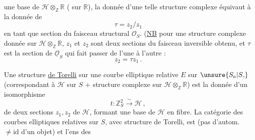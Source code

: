
une base de $\mathscr{H}\otimes_{\mathbb{Z}}\mathbb{R}$ ( sur $\mathbb{R}$), la donnée d'une telle structure complexe équivaut à la donnée de
\[
\tau=z_2/z_1
\tag*{(3)}
\]
en tant que section du faisceau structural $\mathcal{O}_S$. (\uline{NB}  pour une structure complexe donnée sur $\mathscr{H}\otimes_{\mathbb{Z}}\mathbb{R}$, $z_1$ et $z_2$ sont deux sections du faisceau inversible obtenu, et $\tau$ est la section de $\underline{\mathcal{O}}_S$ qui fait passer de l'une à l'autre :
\[
z_2=\tau z_1\,.
\tag*{(3 bis)}
\]

Une structure \uline{de Torelli} sur une  courbe elliptique relative $E$ sur $\unsure{S_a|S{,}}$ (correspondant à $\mathscr{H}$ sur $S$ $+$ structure complexe sur $\mathscr{H}\otimes_{\mathbb{Z}}\mathbb{R}$) est la donnée d'un isomorphisme
\[
t:\mathbb{Z}_S^2\xrightarrow{\sim}\mathscr{H}\,,
\tag*{(4)}
\]
  de deux sections $z_1,z_2$ de $\mathscr{H}$,  formant une base de $\mathscr{H}$ en  fibre. La catégorie des courbes elliptiques relatives sur $S$, avec structure de Torelli, est   (pas d'autom. $\ne\mathrm{id}$ d'un objet) et l'ens des

